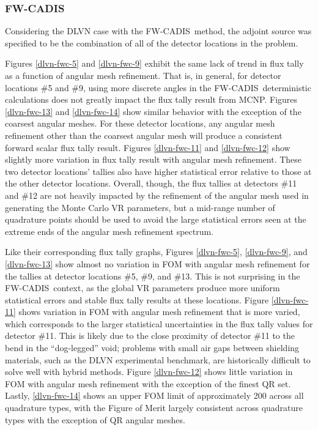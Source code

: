 \documentclass{article} %
\newcommand{\fwc}{\mbox{FW-CADIS}}
\begin{document}
\FloatBarrier
\subsubsection{\fwc}

Considering the DLVN case with the \fwc\ method, the adjoint source was
specified to be the combination of all of the detector locations in the
problem.

Figures \ref{dlvn-fwc-5} and \ref{dlvn-fwc-9} exhibit the same lack of trend in
flux tally as a function of angular mesh refinement. That is, in general, for
detector locations \#5 and \#9, using more discrete angles in the \fwc\
deterministic calculations does not greatly impact the flux tally result from
MCNP. Figures \ref{dlvn-fwc-13} and \ref{dlvn-fwc-14} show similar behavior
with the exception of the coarsest angular meshes. For these detector
locations, any angular mesh refinement other than the coarsest angular mesh
will produce a consistent forward scalar flux tally result. Figures
\ref{dlvn-fwc-11} and \ref{dlvn-fwc-12} show slightly more variation in flux
tally result with angular mesh refinement. These two detector locations'
tallies also have higher statistical error relative to those at the other
detector locations. Overall, though, the flux tallies at detectors \#11 and
\#12 are not heavily impacted by the refinement of the angular mesh used in
generating the Monte Carlo VR parameters, but a mid-range number of
quadrature points should be used to avoid the large statistical errors seen at
the extreme ends of the angular mesh refinement spectrum.

Like their corresponding flux tally graphs, Figures \ref{dlvn-fwc-5},
\ref{dlvn-fwc-9}, and \ref{dlvn-fwc-13} show almost no variation in FOM with
angular mesh refinement for the tallies at detector locations \#5, \#9, and
\#13. This is not surprising in the \fwc\ context, as the global VR parameters
produce more uniform statistical errors and
stable flux tally results at these locations. Figure \ref{dlvn-fwc-11} shows
variation in FOM with angular mesh refinement that is more varied, which
corresponds to the larger statistical uncertainties in the flux tally values
for detector \#11. This is likely due to the close proximity of detector \#11
to the bend in the ``dog-legged'' void; problems with small air gaps between
shielding materials, such as the DLVN experimental benchmark, are historically
difficult to solve well with hybrid methods.
Figure \ref{dlvn-fwc-12} shows little variation in FOM with
angular mesh refinement with the exception of the finest QR set. Lastly,
\ref{dlvn-fwc-14} shows an upper FOM limit of approximately 200 across all
quadrature types, with the Figure of Merit largely consistent across
quadrature types with the exception of QR angular meshes.
\end{document}
